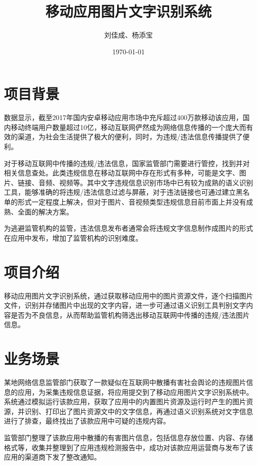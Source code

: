 \documentclass[UTF8]{ctexart}
\title{移动应用图片文字识别系统}
\author{刘佳成、杨添宝}
\date{\today}
\begin{document}
	
	\maketitle
	
	\section{项目背景}
		\par 数据显示，截至2017年国内安卓移动应用市场中充斥超过400万款移动该应用，国内移动终端用户数量超过10亿，移动互联网俨然成为网络信息传播的一个庞大而有效的渠道，为社会生活提供了极大的便利，同时，为违规/违法信息传播提供了便利。
		\par 对于移动互联网中传播的违规/违法信息，国家监管部门需要进行管控，找到并对相关信息查处。此类违规信息在移动互联网中存在形式有多种，可能是文字、图片、链接、音频、视频等。其中文字违规信息识别市场中已有较为成熟的语义识别工具，能够准确的将违规/违法信息过滤与屏蔽，对于违法链接也可通过建立黑名单的形式一定程度上解决，但对于图片、音视频类型违规信息目前市面上并没有成熟、全面的解决方案。
		\par 为逃避监管机构的监管，违法信息发布者通常会将违规文字信息制作成图片的形式在应用中发布，增加了监管机构的识别难度。
		
	\section{项目介绍}
		\par 移动应用图片文字识别系统，通过获取移动应用中的图片资源文件，逐个扫描图片文件，识别并存储图片中出现的文字内容，进一步可通过语义识别工具判别文字内容是否为不良信息，从而帮助监管机构筛选出移动互联网中传播的违规/违法图片信息。
	
	\section{业务场景}
		\par 某地网络信息监管部门获取了一款疑似在互联网中散播有害社会舆论的违规图片信息的应用，为采集违规信息证据，将应用提交到了移动应用图片文字识别系统中。系统通过模拟运行该款应用，获取了应用中的内置图片资源及运行时产生的图片资源，并识别、打印出了图片资源文中的文字信息，再通过语义识别系统对文字信息进行了排查，最终找出了该款应用中可疑的违规内容。
		\par 监管部门整理了该款应用中散播的有害图片信息，包括信息存放位置、内容、存储格式等，收集并整理到了应用违规检测报告中，成功对该款应用运营商与发布了该应用的渠道商下发了整改通知。
		
\end{document}
